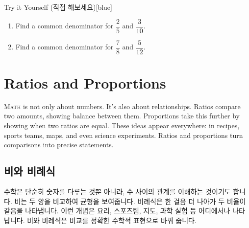 \documentclass[12pt]{book}
\begin{document}
\begin{flexbox}{Try it Yourself (직접 해보세요)}[blue]
\begin{enumerate}
  \item Find a common denominator for $\dfrac{2}{5}$ and $\dfrac{3}{10}$. \vspace*{20pt}
  \item Find a common denominator for $\dfrac{7}{8}$ and $\dfrac{5}{12}$. \vspace*{20pt}
\end{enumerate}
\end{flexbox}






















  \onesidedpaper\chapter{Ratios and Proportions}
  \lettrine{M}{ath} is not only about numbers. It's also about 
  relationships. Ratios compare two amounts, showing balance between them. 
  Proportions take this further by showing when two ratios are equal. 
  These ideas appear everywhere: in recipes, sports teams, maps, and even 
  science experiments. Ratios and proportions turn comparisons into 
  precise statements.

  \section*{비와 비례식}
  수학은 단순히 숫자를 다루는 것뿐 아니라, 수 사이의 관계를 이해하는 
  것이기도 합니다. 비는 두 양을 비교하여 균형을 보여줍니다. 비례식은 한 걸음 
  더 나아가 두 비율이 같음을 나타냅니다. 이런 개념은 요리, 스포츠팀, 지도, 
  과학 실험 등 어디에서나 나타납니다. 비와 비례식은 비교를 정확한 수학적 
  표현으로 바꿔 줍니다.


\end{document}
